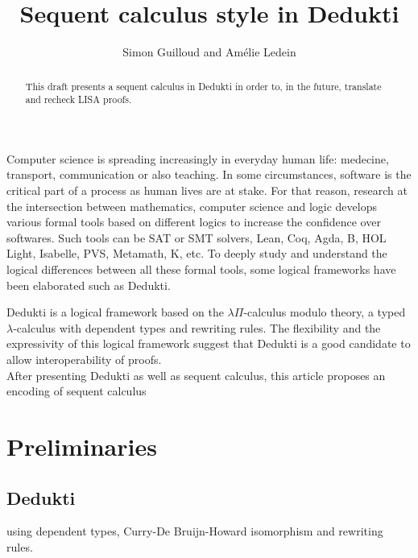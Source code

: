 \documentclass{article}
\title{Sequent calculus style in Dedukti}
\author{Simon Guilloud and Amélie Ledein}
\date{}
\begin{document}
	\maketitle

	\begin{abstract}
		This draft presents a sequent calculus in Dedukti in order to, in the future, translate and recheck LISA proofs.
	\end{abstract}

	Computer science is spreading increasingly in everyday human life: medecine, transport, communication or also teaching. In some circumstances, software is the critical part of a process as human lives are at stake.
	For that reason, research at the intersection between mathematics, computer science and logic develops various formal tools
	based on different logics to increase the confidence over softwares.
	Such tools can be SAT or SMT solvers, 
	Lean, Coq, Agda, B, HOL Light, Isabelle, PVS, Metamath, K, etc.
	To deeply study and understand the logical differences between all these formal tools, some logical frameworks have been elaborated such as Dedukti.

	Dedukti is a logical framework based on the $\lambda\Pi$-calculus modulo theory, a typed $\lambda$-calculus with dependent types and rewriting rules.
	The flexibility and the expressivity of this logical framework suggest that Dedukti is a good candidate to allow interoperability of proofs. \\


	After presenting Dedukti as well as sequent calculus, this article proposes an encoding of sequent calculus 

\newpage

	\section{Preliminaries}

	\subsection{Dedukti}
	
	
	using dependent types, Curry-De Bruijn-Howard isomorphism and rewriting rules.
	
\end{document}
